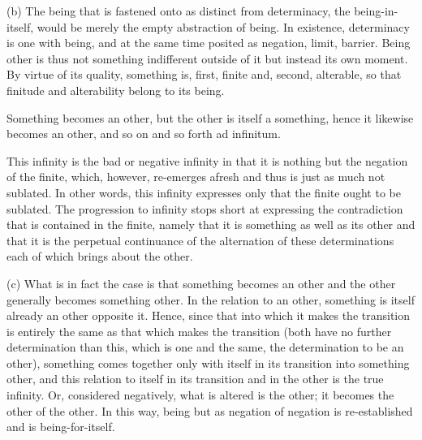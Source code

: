 (b) The being that is fastened onto as distinct from determinacy,
the being-in-itself, would be merely the empty abstraction of being.
In existence, determinacy is one with being, and
at the same time posited as negation, limit, barrier.
Being other is thus not something indifferent outside of it
but instead its own moment.
By virtue of its quality, something is,
first, finite and, second, alterable,
so that finitude and alterability belong to its being.

Something becomes an other,
but the other is itself a something,
hence it likewise becomes an other,
and so on and so forth ad infinitum.

This infinity is the bad or negative infinity in that
it is nothing but the negation of the finite, which, however,
re-emerges afresh and thus is just as much not sublated.
In other words, this infinity expresses only that
the finite ought to be sublated.
The progression to infinity stops short at expressing
the contradiction that is contained in the finite,
namely that it is something as well as its other and
that it is the perpetual continuance of the alternation
of these determinations each of which brings about the other.

(c) What is in fact the case is that something becomes an other
and the other generally becomes something other.
In the relation to an other,
something is itself already an other opposite it.
Hence, since that into which it makes the transition is
entirely the same as that which makes the transition
(both have no further determination than this,
which is one and the same, the determination to be an other),
something comes together only with itself
in its transition into something other, and
this relation to itself in its transition and
in the other is the true infinity.
Or, considered negatively, what is altered is the other;
it becomes the other of the other.
In this way, being but as negation of negation is
re-established and is being-for-itself.

